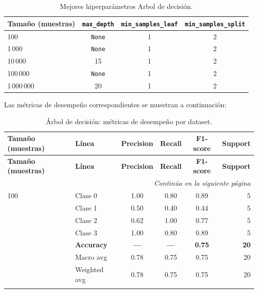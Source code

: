 \documentclass[12pt,a4paper]{article}
\begin{document}
\begin{enumerate}
  \begin{table}[htbp]
    \centering\small
    \setlength{\tabcolsep}{4pt}
    \begin{tabularx}{\linewidth}{@{}lccc@{}}
      \toprule
      \textbf{Tamaño (muestras)} & \texttt{max\_depth} & \texttt{min\_samples\_leaf} & \texttt{min\_samples\_split} \\
      \midrule
      100         & \texttt{None} & 1 & 2 \\
      1\,000      & \texttt{None} & 1 & 2 \\
      10\,000     & 15            & 1 & 2 \\
      100\,000    & \texttt{None} & 1 & 2 \\
      1\,000\,000 & 20            & 1 & 2 \\
      \bottomrule
    \end{tabularx}
    \caption{Mejores hiperparámetros Arbol de decisión.}
    \label{tab:dt_best_hparams_by_size}
  \end{table}

  Las métricas de desempeño correspondientes se muestran a continuación:

  \small
  \setlength{\tabcolsep}{4pt}
  \begin{longtable}{@{}l l c c c r@{}}
    \toprule
    \textbf{Tamaño (muestras)} & \textbf{Línea} & \textbf{Precision} & \textbf{Recall} & \textbf{F1-score} & \textbf{Support} \\
    \midrule
    \endfirsthead

    \toprule
    \textbf{Tamaño (muestras)} & \textbf{Línea} & \textbf{Precision} & \textbf{Recall} & \textbf{F1-score} & \textbf{Support} \\
    \midrule
    \endhead

    \midrule
    \multicolumn{6}{r}{\emph{Continúa en la siguiente página}} \\
    \endfoot

    \bottomrule
    \caption{Árbol de decisión: métricas de desempeño por dataset.}
    \label{tab:dt_metrics_by_size}
    \endlastfoot

    100   & Clase 0       & 1.00 & 0.80 & 0.89 & 5 \\
          & Clase 1       & 0.50 & 0.40 & 0.44 & 5 \\
          & Clase 2       & 0.62 & 1.00 & 0.77 & 5 \\
          & Clase 3       & 1.00 & 0.80 & 0.89 & 5 \\
          & \textbf{Accuracy}    & \textbf{—}   & \textbf{—}   & \textbf{0.75} & \textbf{20} \\
          & Macro avg     & 0.78 & 0.75 & 0.75 & 20 \\
          & Weighted avg  & 0.78 & 0.75 & 0.75 & 20 \\
    \addlinespace


\end{longtable}
\end{enumerate}
\end{document}
